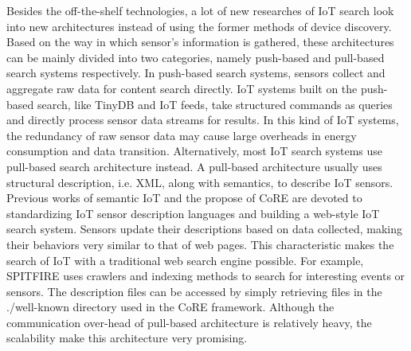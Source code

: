 \documentclass[conference]{IEEEtran}
\begin{document}
Besides the off-the-shelf technologies, a lot of new researches of IoT search look into new architectures instead of using the former methods of device discovery. 
Based on the way in which sensor’s information is gathered, these architectures can be mainly divided into two categories, namely push-based and pull-based search systems respectively.
In push-based search systems, sensors collect and aggregate raw data for content search directly.
IoT systems built on the push-based search, like TinyDB\cite{TinyDB} and IoT feeds\cite{Whitehouse2006}, take structured commands as queries and directly process sensor data streams for results. 
In this kind of IoT systems, the redundancy of raw sensor data may cause large overheads in energy consumption and data transition.
Alternatively, most IoT search systems use pull-based search architecture instead.
A pull-based architecture usually uses structural description, i.e. XML, along with semantics, to describe IoT sensors. 
Previous works of semantic IoT\cite{Compton2012} and the propose of CoRE\cite{CoREWorkingGroup2012} are devoted to standardizing IoT sensor description languages and building a web-style IoT search system. 
Sensors update their descriptions based on data collected, making their behaviors very similar to that of web pages.
This characteristic makes the search of IoT with a traditional web search engine possible. 
For example, SPITFIRE\cite{SPITFIRE} uses crawlers and indexing methods to search for interesting events or sensors. 
The description files can be accessed by simply retrieving files in the ./well-known directory used in the CoRE framework. 
Although the communication over-head of pull-based architecture is relatively heavy, the scalability make this architecture very promising.
\end{document}
